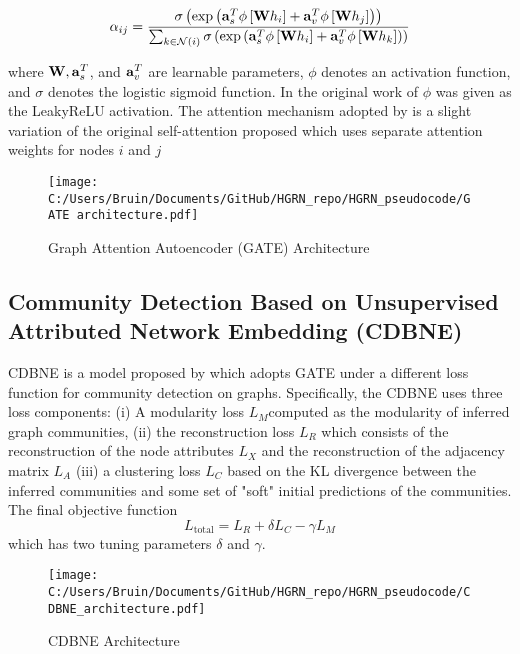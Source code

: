 \documentclass[a4paper,12pt]{article}
\begin{document}
	\[ \alpha_{ij} = \frac{\sigma\left(\exp\left({\bf a}_s^T\phi\left[{\bf W}h_i\right]+{\bf a}_v^T\phi\left[{\bf W}h_j \right]\right)\right)}
	{\sum_{k\in \mathcal{N}(i)}\sigma\left(\exp\left({\bf a}_s^T\phi\left[{\bf W}h_i\right]+{\bf a}_v^T\phi\left[{\bf W}h_k \right]\right)\right)} \]
	
	where ${\bf W},{\bf a}_s^T$, and ${\bf a}_v^T$ are learnable parameters, $\phi$ denotes an activation function, and $\sigma$ denotes the logistic sigmoid function. In the original work of \cite{velivckovic2017graph} $\phi$ was given as the LeakyReLU activation. The attention mechanism adopted by \cite{salehi2019graph} is a slight variation of the original self-attention proposed \cite{velivckovic2017graph} which uses separate attention weights for nodes $i$ and $j$ 
	
	\begin{figure}[H]
		\centering
		\caption{Graph Attention Autoencoder (GATE) Architecture}
		\texttt{[image: C:/Users/Bruin/Documents/GitHub/HGRN\_repo/HGRN\_pseudocode/GATE architecture.pdf]}
		\label{fig:gate}
	\end{figure}
	
	
	\subsection{Community Detection Based on Unsupervised Attributed Network Embedding (CDBNE)}
	
	CDBNE is a model proposed by \cite{zhou2023community} which adopts GATE under a different loss function for community detection on graphs. Specifically, the CDBNE uses three loss components: (i) A modularity loss $L_M$computed as the modularity of inferred graph communities, (ii) the reconstruction loss $L_R$ which consists of the reconstruction of the node attributes $L_X$ and the reconstruction of the adjacency matrix $L_A$ (iii) a clustering loss $L_C$ based on the KL divergence between the inferred communities and some set of "soft" initial predictions of the communities. The final objective function
	\[ L_{\text{total}} = L_R+\delta L_C-\gamma L_M \]
	which has two tuning parameters $\delta$ and $\gamma$.
	\begin{figure}[H]
		\centering
		\caption{CDBNE Architecture}
		\texttt{[image: C:/Users/Bruin/Documents/GitHub/HGRN\_repo/HGRN\_pseudocode/CDBNE\_architecture.pdf]}
		\label{fig:gae}
	\end{figure}
	
	
	
	
	
\end{document}

